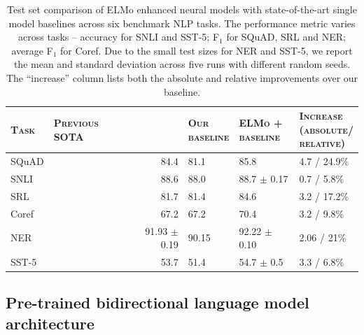 \documentclass[11pt,a4paper]{article}
\newcommand{\ELMO}{ELMo}
\begin{document}
\begin{table}   %
\centering
\begin{tabular}{l|lr||p{8ex}p{12ex}p{11ex}}
\textsc{\textbf{Task}}  & \textsc{\textbf{Previous SOTA}} & & \parbox{6ex}{\textsc{\textbf{Our \\ baseline}}} & \parbox{9ex}{\textsc{\textbf{\ELMO{} + \\ baseline}}} & \parbox{11ex}{\textsc{\textbf{Increase \\ (absolute/\\ relative)}}} \\ \hline \hline
SQuAD  &  \citet{liu2017stochastic}  & 84.4 & 81.1 & 85.8 & 4.7 / 24.9\% \\
SNLI   &  \citet{Chen2017EnhancedLF}  & 88.6 & 88.0  & 88.7 $\pm$ 0.17 & 0.7 / 5.8\% \\
SRL    &  \citet{He2017DeepSR} &  81.7  & 81.4  & 84.6 & 3.2 / 17.2\% \\
Coref  &  \citet{Lee2017EndtoendNC} & 67.2 & 67.2 & 70.4 & 3.2 / 9.8\%\\
NER    &  \citet{Peters2017SemisupervisedST} & 91.93 $\pm$ 0.19 & 90.15 & 92.22 $\pm$ 0.10 & 2.06 / 21\% \\
SST-5  & \citet{McCann2017LearnedIT} & 53.7 & 51.4 & 54.7 $\pm$ 0.5 & 3.3 / 6.8\%
\end{tabular}
\caption{Test set comparison of \ELMO{} enhanced neural models with state-of-the-art single model baselines across six benchmark NLP tasks.
The performance metric varies across tasks -- accuracy for SNLI and SST-5; F$_1$ for SQuAD, SRL and NER; average F$_1$ for Coref.
Due to the small test sizes for NER and SST-5, we report the mean and standard deviation across five runs with different random seeds.
The ``increase'' column lists both the absolute and relative improvements over our baseline.}
\label{table:overall}
\end{table}  %



\subsection{Pre-trained bidirectional language model architecture}
\label{sec:pretrainedLMs}
\end{document}
